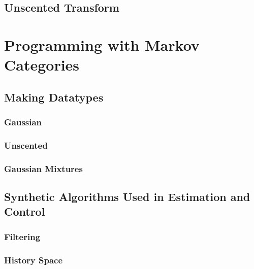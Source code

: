 \section{Unscented Transform}

\chapter{Programming with Markov Categories}
\section{Making Datatypes}
\subsection{Gaussian}
\subsection{Unscented}
\subsection{Gaussian Mixtures}

\section{Synthetic Algorithms Used in Estimation and Control}
\subsection{Filtering}
\subsection{History Space}

